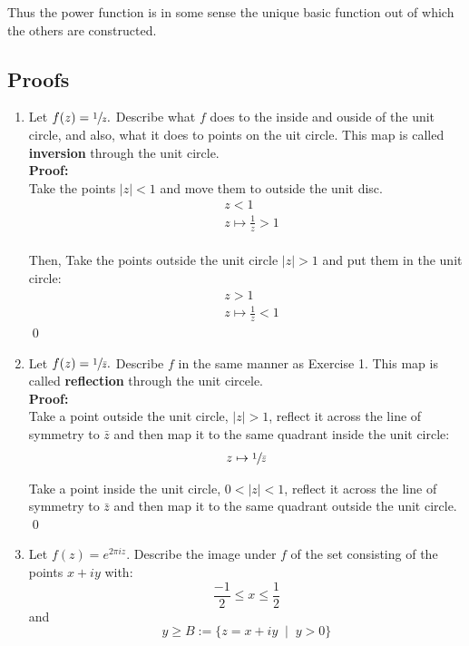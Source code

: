 Thus the power function is in some sense the unique basic function out of which the others are constructed.


\subsection{Proofs}
\begin{enumerate}
	\item Let $f(z) = \sfrac{1}{z}.$ Describe what $f$ does to the inside and ouside of the unit circle, and also, what it does to points on the uit circle. This map is called \textbf{inversion} through the unit circle. \\
	
	\textbf{Proof:} \\
	Take the points $|z| < 1$ and move them to outside the unit disc.
	\begin{align*}
		&z < 1 \\
		&z \mapsto \frac{1}{z} > 1
	\end{align*}
	\\
	Then, Take the points outside the unit circle $|z| > 1$ and put them in the unit circle:
	\begin{align*}
		&z > 1 \\
		&z \mapsto \frac{1}{z} < 1
	\end{align*}
	\qed


	\item Let $f(z) = \sfrac{1}{\bar{z}}.$ Describe $f$ in the same manner as Exercise 1. 
	This map is called \textbf{reflection} through the unit circele. \\
	
	\textbf{Proof:} \\
	Take a point outside the unit circle, $|z| > 1$, reflect it across the line of symmetry to $\bar{z}$ and then map it to the same quadrant inside the unit circle:
	\begin{align*}
		z \mapsto \sfrac{1}{\bar{z}} \\
	\end{align*}

	Take a point inside the unit circle, $0 < |z| < 1$, reflect it across the line of symmetry to $\bar{z}$ and then map it to the same quadrant outside the unit circle. 
	\qed


	\item Let $f(z) = e^{2\pi iz}.$ Describe the image under $f$ of the set consisting of the points $x + iy$ with:
	\[ \frac{-1}{2} \leq x \leq \frac{1}{2} \]
	and
	\[ y \geq B := \{ z = x + iy \;\;|\;\; y > 0 \} \] \\


\end{enumerate}
